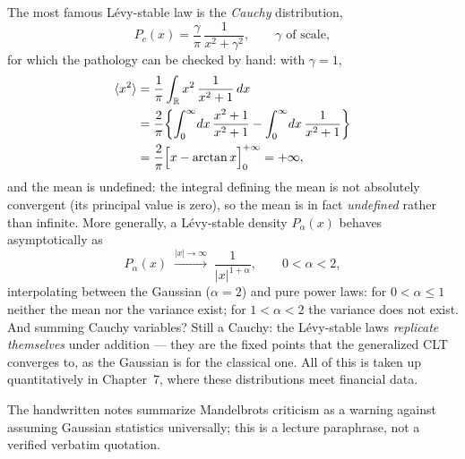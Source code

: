 The most famous L\'evy-stable law is the \emph{Cauchy} distribution,
\begin{equation}
P_c(x)=\frac{\gamma}{\pi}\,\frac{1}{x^2+\gamma^2},
\qquad \gamma \text{ of scale},
\end{equation}
for which the pathology can be checked by hand: with $\gamma=1$,
\begin{equation}\begin{split}
\langle x^2\rangle &= \frac{1}{\pi}\int_{\mathbb{R}} x^2\,\frac{1}{x^2+1}\,dx\\
&= \frac{2}{\pi}\biggl\{\int_0^{\infty}\!dx\,\frac{x^2+1}{x^2+1} - \int_0^{\infty}\!dx\,\frac{1}{x^2+1}\biggr\}\\
&= \frac{2}{\pi}\Bigl[x-\arctan x\Bigr]_0^{+\infty} = +\infty,
\end{split}\end{equation}
and the mean is undefined: the integral defining the mean is not absolutely convergent (its principal value is zero), so the mean is in fact \emph{undefined} rather than infinite.
More generally, a L\'evy-stable density $P_\alpha(x)$ behaves asymptotically as
\begin{equation}
P_\alpha(x) \;\xrightarrow{|x|\to\infty}\; \frac{1}{|x|^{1+\alpha}},
\qquad 0<\alpha<2,
\end{equation}
interpolating between the Gaussian ($\alpha=2$) and pure power laws: for $0<\alpha\le1$ neither the mean nor the variance exist; for $1<\alpha<2$ the variance does not exist.
And summing Cauchy variables? Still a Cauchy: the L\'evy-stable laws \emph{replicate themselves} under addition --- they are the fixed points that the generalized CLT converges to, as the Gaussian is for the classical one.
All of this is taken up quantitatively in Chapter~7, where these distributions meet financial data.

The handwritten notes summarize Mandelbrot\textquotesingle s criticism as a warning against assuming Gaussian statistics universally; this is a lecture paraphrase, not a verified verbatim quotation.
